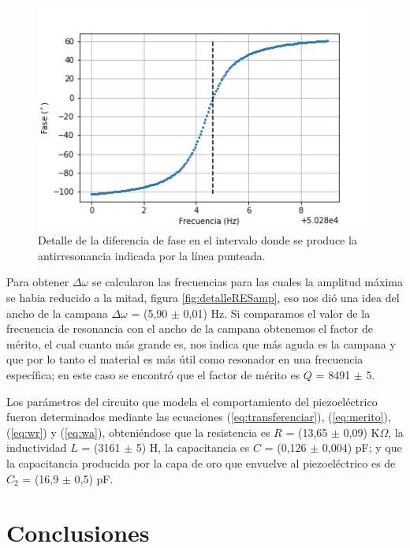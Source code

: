 \documentclass[twoside,twocolumn,a4paper]{article}
\begin{document}
\begin{figure}[H]
\includegraphics[width=\linewidth]{subida.jpg}
\caption{Detalle de la diferencia de fase en el intervalo donde se produce la antirresonancia indicada por la l\'inea punteada.}
\label{fig:subida}
\end{figure}

Para obtener $\Delta \omega$ se calcularon las frecuencias para las cuales la amplitud m\'axima se habia reducido a la mitad, figura \ref{fig:detalleRESamp}, eso nos di\'o una idea del ancho de la campana $\Delta \omega$ = (5,90 $\pm$ 0,01) Hz. Si comparamos el valor de la frecuencia de resonancia con el ancho de la campana obtenemos el factor de m\'erito, el cual cuanto m\'as grande es, nos indica que m\'as aguda es la campana y que por lo tanto el material es m\'as \'util como resonador en una frecuencia espec\'ifica; en este caso se encontr\'o que el factor de m\'erito es $Q$ = 8491 $\pm$ 5.

Los par\'ametros del circuito que modela el comportamiento del piezoel\'ectrico fueron determinados mediante las ecuaciones (\ref{eq:transferenciar}), (\ref{eq:merito}), (\ref{eq:wr}) y (\ref{eq:wa}), obteni\'endose que la resistencia es $R$ = (13,65 $\pm$ 0,09) K$\Omega$, la inductividad $L$ = (3161 $\pm$ 5) H, la capacitancia es $C$ = (0,126 $\pm$ 0,004) pF; y que la capacitancia producida por la capa de oro que envuelve al piezoel\'ectrico es de $C_{2}$ = (16,9 $\pm$ 0,5) pF.


\section{Conclusiones}
\end{document}
